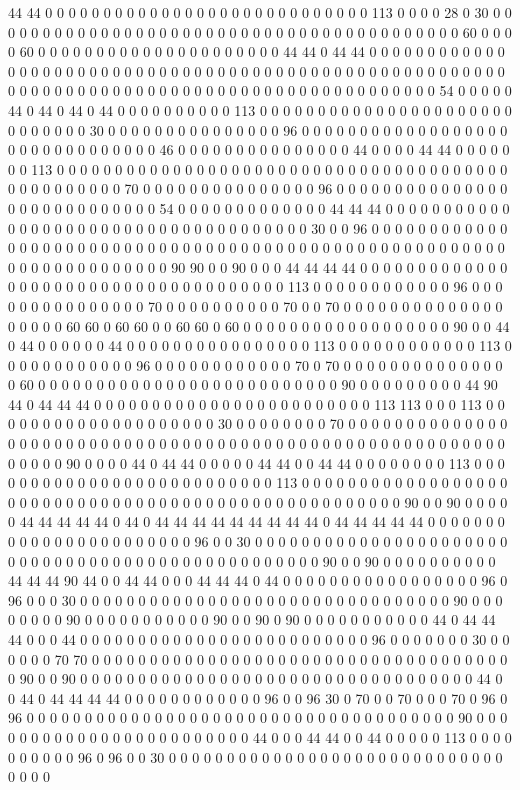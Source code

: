 44 44 0 0 0 0 0 0 0 0 0 0 0 0 0 0 0 0 0 0 0 0 0 0 0 0 0 0 0 0 113 0 0 0 0 28 0 30 0 0 0 0 0 0 0 0 0 0 0 0 0 0 0 0 0 0 0 0 0 0 0 0 0 0 0 0 0 0 0 0 0 0 0 0 0 0 0 0 0 60 0 0 0 0 60 0 0 0 0 0 0 0 0 0 0 0 0 0 0 0 0 0 0 0 0 0 44 44 0 44 44 0 0 0 0 0 0 0 0 0 0 0 0 0 0 0 0 0 0 0 0 0 0 0 0 0 0 0 0 0 0 0 0 0 0 0 0 0 0 0 0 0 0 0 0 0 0 0 0 0 0 0 0 0 0 0 0 0 0 0 0 0 0 0 0 0 0 0 0 0 0 0 0 0 0 0 0 0 0 0 0 0 0 0 0 0 0 0 0 0 0 0 0 54 0 0 0 0 0 44 0 44 0 44 0 44 0 0 0 0 0 0 0 0 0 0 113 0 0 0 0 0 0 0 0 0 0 0 0 0 0 0 0 0 0 0 0 0 0 0 0 0 0 0 0 0 30 0 0 0 0 0 0 0 0 0 0 0 0 0 0 0 96 0 0 0 0 0 0 0 0 0 0 0 0 0 0 0 0 0 0 0 0 0 0 0 0 0 0 0 0 0 0 0 46 0 0 0 0 0 0 0 0 0 0 0 0 0 0 0 44 0 0 0 0 44 44 0 0 0 0 0 0 0 113 0 0 0 0 0 0 0 0 0 0 0 0 0 0 0 0 0 0 0 0 0 0 0 0 0 0 0 0 0 0 0 0 0 0 0 0 0 0 0 0 0 0 0 0 0 0 0 0 0 70 0 0 0 0 0 0 0 0 0 0 0 0 0 0 0 96 0 0 0 0 0 0 0 0 0 0 0 0 0 0 0 0 0 0 0 0 0 0 0 0 0 0 0 0 54 0 0 0 0 0 0 0 0 0 0 0 0 0 44 44 44 0 0 0 0 0 0 0 0 0 0 0 0 0 0 0 0 0 0 0 0 0 0 0 0 0 0 0 0 0 0 0 0 0 0 0 0 0 30 0 0 96 0 0 0 0 0 0 0 0 0 0 0 0 0 0 0 0 0 0 0 0 0 0 0 0 0 0 0 0 0 0 0 0 0 0 0 0 0 0 0 0 0 0 0 0 0 0 0 0 0 0 0 0 0 0 0 0 0 0 0 0 0 0 0 0 0 0 0 0 0 90 90 0 0 90 0 0 0 44 44 44 44 0 0 0 0 0 0 0 0 0 0 0 0 0 0 0 0 0 0 0 0 0 0 0 0 0 0 0 0 0 0 0 0 0 0 0 0 0 113 0 0 0 0 0 0 0 0 0 0 0 0 96 0 0 0 0 0 0 0 0 0 0 0 0 0 0 0 70 0 0 0 0 0 0 0 0 0 0 70 0 0 70 0 0 0 0 0 0 0 0 0 0 0 0 0 0 0 0 0 0 0 60 60 0 60 60 0 0 60 60 0 60 0 0 0 0 0 0 0 0 0 0 0 0 0 0 0 0 0 0 90 0 0 44 0 44 0 0 0 0 0 0 44 0 0 0 0 0 0 0 0 0 0 0 0 0 0 0 0 113 0 0 0 0 0 0 0 0 0 0 0 0 113 0 0 0 0 0 0 0 0 0 0 0 0 96 0 0 0 0 0 0 0 0 0 0 0 0 70 0 70 0 0 0 0 0 0 0 0 0 0 0 0 0 0 0 60 0 0 0 0 0 0 0 0 0 0 0 0 0 0 0 0 0 0 0 0 0 0 0 0 0 0 90 0 0 0 0 0 0 0 0 0 44 90 44 0 44 44 44 0 0 0 0 0 0 0 0 0 0 0 0 0 0 0 0 0 0 0 0 0 0 0 0 113 113 0 0 0 113 0 0 0 0 0 0 0 0 0 0 0 0 0 0 0 0 0 0 0 0 30 0 0 0 0 0 0 0 0 70 0 0 0 0 0 0 0 0 0 0 0 0 0 0 0 0 0 0 0 0 0 0 0 0 0 0 0 0 0 0 0 0 0 0 0 0 0 0 0 0 0 0 0 0 0 0 0 0 0 0 0 0 0 0 0 0 0 0 0 0 0 0 90 0 0 0 0 44 0 44 44 0 0 0 0 0 44 44 0 0 44 44 0 0 0 0 0 0 0 0 113 0 0 0 0 0 0 0 0 0 0 0 0 0 0 0 0 0 0 0 0 0 0 0 0 0 0 113 0 0 0 0 0 0 0 0 0 0 0 0 0 0 0 0 0 0 0 0 0 0 0 0 0 0 0 0 0 0 0 0 0 0 0 0 0 0 0 0 0 0 0 0 0 0 0 0 0 0 0 0 90 0 0 90 0 0 0 0 0 44 44 44 44 44 0 44 0 44 44 44 44 44 44 44 44 44 0 44 44 44 44 44 0 0 0 0 0 0 0 0 0 0 0 0 0 0 0 0 0 0 0 0 0 0 0 96 0 0 30 0 0 0 0 0 0 0 0 0 0 0 0 0 0 0 0 0 0 0 0 0 0 0 0 0 0 0 0 0 0 0 0 0 0 0 0 0 0 0 0 0 0 0 0 0 0 0 0 0 90 0 0 90 0 0 0 0 0 0 0 0 0 0 44 44 44 90 44 0 0 44 44 0 0 0 44 44 44 0 44 0 0 0 0 0 0 0 0 0 0 0 0 0 0 0 0 0 96 0 96 0 0 0 30 0 0 0 0 0 0 0 0 0 0 0 0 0 0 0 0 0 0 0 0 0 0 0 0 0 0 0 0 0 0 0 0 90 0 0 0 0 0 0 0 0 90 0 0 0 0 0 0 0 0 0 0 0 90 0 0 90 0 90 0 0 0 0 0 0 0 0 0 0 0 44 0 44 44 44 0 0 0 44 0 0 0 0 0 0 0 0 0 0 0 0 0 0 0 0 0 0 0 0 0 0 0 0 0 96 0 0 0 0 0 0 0 30 0 0 0 0 0 0 70 70 0 0 0 0 0 0 0 0 0 0 0 0 0 0 0 0 0 0 0 0 0 0 0 0 0 0 0 0 0 0 0 0 0 0 0 0 0 90 0 0 90 0 0 0 0 0 0 0 0 0 0 0 0 0 0 0 0 0 0 0 0 0 0 0 0 0 0 0 0 0 0 0 0 0 0 44 0 0 44 0 44 44 44 44 0 0 0 0 0 0 0 0 0 0 0 0 96 0 0 96 30 0 70 0 0 70 0 0 0 70 0 96 0 96 0 0 0 0 0 0 0 0 0 0 0 0 0 0 0 0 0 0 0 0 0 0 0 0 0 0 0 0 0 0 0 0 0 0 0 0 0 90 0 0 0 0 0 0 0 0 0 0 0 0 0 0 0 0 0 0 0 0 0 0 0 0 44 0 0 0 44 44 0 0 44 0 0 0 0 0 113 0 0 0 0 0 0 0 0 0 0 96 0 96 0 0 30 0 0 0 0 0 0 0 0 0 0 0 0 0 0 0 0 0 0 0 0 0 0 0 0 0 0 0 0 0 0 0 0 0 